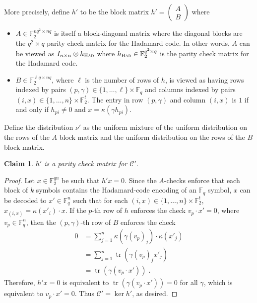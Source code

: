 \documentclass[11pt]{article}
\newtheorem{claim}[theorem]{Claim}
\theoremstyle{definition}
\newcommand{\code}{\mathscr{C}}
\newcommand{\F}{\ensuremath{\mathbb{F}}}
\newcommand{\had}{\textsc{Had}}
\DeclareMathOperator{\tr}{tr}
\begin{document}
More precisely, define $h'$ to be the block matrix $h'=\begin{pmatrix} A \\ B \end{pmatrix}$ where 
\begin{itemize}
	\item $A \in \F_2^{nq^2 \times nq}$ is itself a block-diagonal matrix where the diagonal blocks are the $q^2 \times q$ parity check matrix for the Hadamard code. 
	In other words, $A$ can be viewed as $I_{n\times n} \otimes h_\had$ where $h_\had \in \F_2^{q^2 \times q}$ is the parity check matrix for the Hadamard code. 
	\item $B \in \F_2^{\ell q \times nq}$, where $\ell$ is the number of rows of $h$, is viewed as having rows indexed by pairs $(p,\gamma) \in \{1,\ldots,\ell\} \times \F_q$ and columns indexed by pairs $(i,x) \in \{1,\ldots,n\} \times \F_2^t$. The entry in row $(p,\gamma)$ and column $(i,x)$ is $1$ if and only if $h_{pi} \neq 0$ and $x = \kappa(\gamma h_{pi})$.
\end{itemize}
Define the distribution $\nu'$ as the uniform mixture of the uniform distribution on the rows of the $A$ block matrix and the uniform distribution on the rows of the $B$ block matrix. 

\begin{claim}
$h'$ is a parity check matrix for $\code'$.
\end{claim}


\begin{proof}
Let $x\in \F_2^{qn}$ be such that $h'x=0$. Since the $A$-checks enforce that each block of $k$ symbols contains the Hadamard-code encoding of an $\F_q$ symbol, $x$ can be decoded to $x'\in \F_q^n$ such that for each $(i,x)\in \{1,\ldots,n\}\times \F_2^t$, $x_{(i,x)} = \kappa(x'_i)\cdot x$. If the $p$-th row of $h$ enforces the check $v_p\cdot x'=0$, where $v_p\in \F_q^n$, then 
the $(p,\gamma)$-th row of $B$ enforces the check 
\begin{align*}
0&=\sum_{j=1}^n \kappa(\gamma (v_p)_j) \cdot \kappa(x'_j)\\
&= \sum_{j=1}^n \tr( \gamma (v_p)_j x'_j) \\
&= \tr(\gamma (v_p\cdot  x'))\;.
\end{align*}
Therefore, $h'x=0$ is equivalent to $\tr(\gamma(v_p \cdot x'))=0$ for all $\gamma$, which is equivalent to $v_p\cdot x'=0$. Thus $\code'=\ker h'$, as desired. 
\end{proof}
\end{document}
